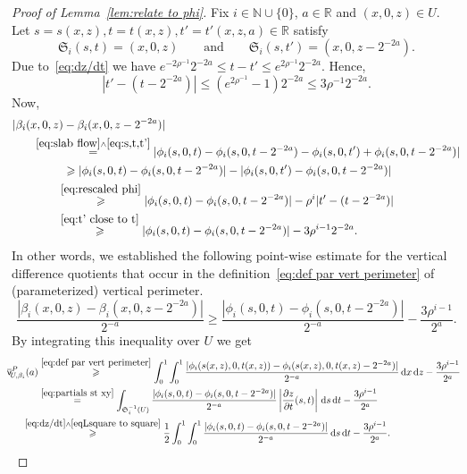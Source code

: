\documentclass[11pt,reqno]{amsart}
\newcommand{\N}{\mathbb{N}}
\newcommand{\R}{\mathbb{R}}
\newcommand{\ud}[0]{\,\mathrm{d}}
\newcommand{\0}{\mathbf{0}}
\renewcommand{\1}{\mathbf 1}
\renewcommand{\ge}{\geqslant}
\renewcommand{\le}{\leqslant}
\theoremstyle{remark}
\newcommand{\vpP}[1]{{\overline{\mathsf{v}}^{P}_{\!#1}}}
\begin{document}
\begin{proof}[Proof of Lemma~\ref{lem:relate to phi}]
Fix $i\in \N\cup \{0\}$, $a\in \R$  and  $(x,0,z)\in U$. Let $s=s(x,z),t=t(x,z),t'=t'(x,z,a)\in \R$ satisfy
\begin{equation}\label{eq:s,t,t'}
\mathfrak{S}_i(s,t)=(x,0,z)\qquad \mathrm{and}\qquad \mathfrak{S}_i(s,t')=(x,0,z-2^{-2a}).
\end{equation}
Due to~\eqref{eq:dz/dt} we have $e^{-2\rho^{-1}}2^{-2a}\le t-t'\le e^{2\rho^{-1}}2^{-2a}$. Hence,
\begin{equation}\label{eq:t' close to t}
|t'-(t-2^{-2a})|\le (e^{2\rho^{-1}}-1)2^{-2a}\le 3\rho^{-1}2^{-2a}.
\end{equation}
Now,
\begin{align*}\label{eq:change to stt'}
|\beta_i(x,0,z)&-\beta_i(x,0,z-2^{-2a})|\\
&\!\!\!\!\!\!\!\!\!\!\!\!\!\!\!\!\stackrel{\eqref{eq:slab flow}\wedge \eqref{eq:s,t,t'}}{=}|\phi_i(s,0,t)-\phi_i(s,0,t-2^{-2a})-\phi_i(s,0,t')+\phi_i(s,0,t-2^{-2a})|\\
&\ge |\phi_i(s,0,t)-\phi_i(s,0,t-2^{-2a})|-|\phi_i(s,0,t')-\phi_i(s,0,t-2^{-2a})|\\
&\!\!\!\stackrel{\eqref{eq:rescaled phi}}{\ge} |\phi_i(s,0,t)-\phi_i(s,0,t-2^{-2a})|-\rho^i|t'-(t-2^{-2a})|\\
&\!\!\!\stackrel{\eqref{eq:t' close to t}}{\ge} |\phi_i(s,0,t)-\phi_i(s,0,t-2^{-2a})|-3\rho^{i-1}2^{-2a}.
\end{align*}
In other words, we established the following point-wise estimate for the vertical difference quotients that occur in the definition~\eqref{eq:def par vert perimeter} of (parameterized) vertical perimeter.
$$
\frac{|\beta_i(x,0,z)-\beta_i(x,0,z-2^{-2a})|}{2^{-a}} \ge \frac{|\phi_i(s,0,t)-\phi_i(s,0,t-2^{-2a})|}{2^{-a}}-\frac{3\rho^{i-1}}{2^{a}}.
$$
By integrating this inequality over $U$ we get
\begin{align}
\begin{split}
\!\!\!\vpP{U,\beta_i}(a)&\stackrel{\eqref{eq:def par vert perimeter}}{\ge} \int_0^1\int_0^1 \frac{|\phi_i(s(x,z),0,t(x,z))-\phi_i(s(x,z),0,t(x,z)-2^{-2a})|}{2^{-a}}\ud x\ud z-\frac{3\rho^{i-1}}{2^{a}}\\
&\stackrel{\eqref{eq:partials st xy}}{=} \int_{\mathfrak{S}_i^{-1}(U)} \frac{|\phi_i(s,0,t)-\phi_i(s,0,t-2^{-2a})|}{2^{-a}}\left|\frac{\partial z}{\partial t}(s,t)\right|\ud s\ud t-\frac{3\rho^{i-1}}{2^{a}}\\
&\!\!\!\!\!\!\!\!\!\!\stackrel{\eqref{eq:dz/dt}\wedge \eqref{eqLsquare to square}}{\ge} \frac12 \int_0^1\int_0^1 \frac{|\phi_i(s,0,t)-\phi_i(s,0,t-2^{-2a})|}{2^{-a}}\ud s\ud t-\frac{3\rho^{i-1}}{2^{a}}.

\end{split}
\end{align}
\end{proof}
\end{document}
